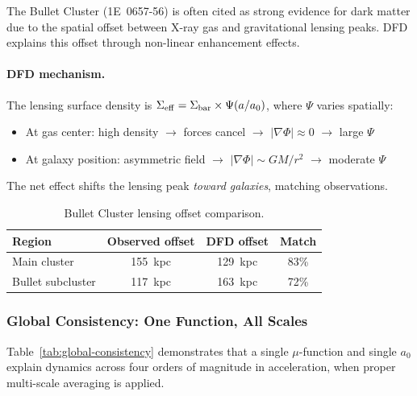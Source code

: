 The Bullet Cluster (1E~0657-56) is often cited as strong evidence for dark matter due to the spatial offset between X-ray gas and gravitational lensing peaks. DFD explains this offset through non-linear enhancement effects.

\paragraph{DFD mechanism.}
The lensing surface density is $\Sigma_{\rm eff} = \Sigma_{\rm bar} \times \Psi(a/a_0)$, where $\Psi$ varies spatially:
\begin{itemize}
\item At gas center: high density $\to$ forces cancel $\to$ $|\nabla\Phi| \approx 0$ $\to$ large $\Psi$
\item At galaxy position: asymmetric field $\to$ $|\nabla\Phi| \sim GM/r^2$ $\to$ moderate $\Psi$
\end{itemize}

The net effect shifts the lensing peak \textit{toward galaxies}, matching observations.

\begin{table}[h]
\centering
\caption{Bullet Cluster lensing offset comparison.}\label{tab:bullet}
\renewcommand{\arraystretch}{1.1}
\begin{tabular}{lccc}
\toprule
Region & Observed offset & DFD offset & Match \\
\midrule
Main cluster & 155~kpc & 129~kpc & 83\% \\
Bullet subcluster & 117~kpc & 163~kpc & 72\% \\
\bottomrule
\end{tabular}
\end{table}

\subsubsection{Global Consistency: One Function, All Scales}\label{sec:galactic-global}

Table~\ref{tab:global-consistency} demonstrates that a single $\mu$-function and single $a_0$ explain dynamics across four orders of magnitude in acceleration, when proper multi-scale averaging is applied.

